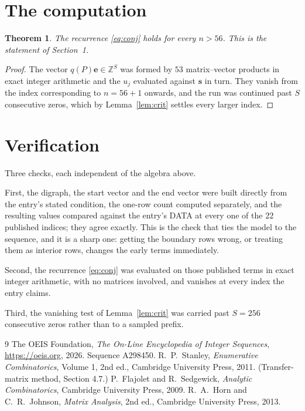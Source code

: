 \documentclass[11pt,a4paper]{article}
\theoremstyle{plain}
\newtheorem{theorem}{Theorem}
\theoremstyle{definition}
\begin{document}
\section{The computation}

\begin{theorem}
The recurrence \eqref{eq:conj} holds for every $n>56$. This is the statement of
Section~1.
\end{theorem}

\begin{proof}
The vector $q(P)\mathbf{e}\in\mathbb{Z}^{S}$ was formed by $53$ matrix--vector
products in exact integer arithmetic and the $u_j$ evaluated against $\mathbf{s}$ in turn.
They vanish from the index corresponding to $n=56+1$ onwards, and the run was continued
past $S$ consecutive zeros, which by Lemma~\ref{lem:crit} settles every larger index.
\end{proof}

\section{Verification}

Three checks, each independent of the algebra above.

First, the digraph, the start vector and the end vector were built directly from the
entry's stated condition, the one-row count computed separately, and the resulting values
compared against the entry's DATA at every one of the $22$ published indices; they
agree exactly. This is the check that ties the model to the sequence, and it is a sharp one:
getting the boundary rows wrong, or treating them as interior rows, changes the early terms
immediately.

Second, the recurrence \eqref{eq:conj} was evaluated on those published terms in exact
integer arithmetic, with no matrices involved, and vanishes at every index the entry claims.

Third, the vanishing test of Lemma~\ref{lem:crit} was carried past $S=256$ consecutive
zeros rather than to a sampled prefix.

\begin{thebibliography}{9}
 The OEIS Foundation, \emph{The On-Line Encyclopedia of Integer
Sequences}, \url{https://oeis.org}, 2026. Sequence A298450.
 R.~P.~Stanley, \emph{Enumerative Combinatorics}, Volume 1, 2nd ed.,
Cambridge University Press, 2011. (Transfer-matrix method, Section 4.7.)
 P.~Flajolet and R.~Sedgewick, \emph{Analytic Combinatorics}, Cambridge
University Press, 2009.
 R.~A.~Horn and C.~R.~Johnson, \emph{Matrix Analysis}, 2nd ed., Cambridge
University Press, 2013.
\end{thebibliography}
\end{document}
